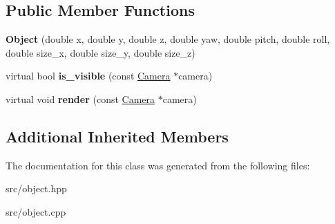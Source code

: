 \subsection*{Public Member Functions}
\begin{DoxyCompactItemize}
\item 
{\bfseries Object} (double x, double y, double z, double yaw, double pitch, double roll, double size\+\_\+x, double size\+\_\+y, double size\+\_\+z)\hypertarget{class_object_a7183ffb5489cedf54629055db8d57ff5}{}\label{class_object_a7183ffb5489cedf54629055db8d57ff5}

\item 
virtual bool {\bfseries is\+\_\+visible} (const \hyperlink{class_camera}{Camera} $\ast$camera)\hypertarget{class_object_ab4c6e9456feda15cf49b85ce196666e6}{}\label{class_object_ab4c6e9456feda15cf49b85ce196666e6}

\item 
virtual void {\bfseries render} (const \hyperlink{class_camera}{Camera} $\ast$camera)\hypertarget{class_object_a7b6ef90438e4b82e479197bc6261c25a}{}\label{class_object_a7b6ef90438e4b82e479197bc6261c25a}

\end{DoxyCompactItemize}
\subsection*{Additional Inherited Members}


The documentation for this class was generated from the following files\+:\begin{DoxyCompactItemize}
\item 
src/object.\+hpp\item 
src/object.\+cpp\end{DoxyCompactItemize}

